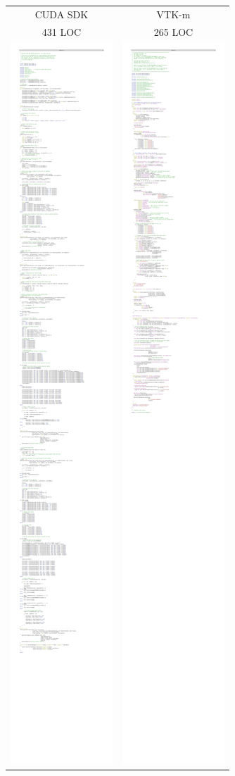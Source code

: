 \begin{figure}[htb]
  \centering
  \begin{tabular}{cc}
    CUDA SDK & VTK-m \\
    {\small 431 LOC} & {\small 265 LOC} \\
    \includegraphics[width=.75in]{images/MCCompareCuda} &
    \includegraphics[width=.75in]{images/MCCompareVTKm}

\end{tabular}
\end{figure}
